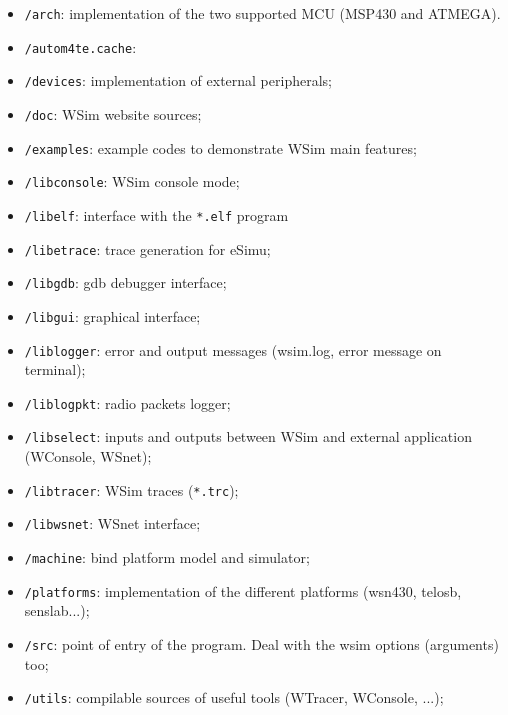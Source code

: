 \documentclass[a4paper,10pt]{report}
\begin{document}
\begin{itemize}
  \item \verb$/arch$: implementation of the two supported MCU (MSP430 and ATMEGA).

  \item \verb$/autom4te.cache$:

  \item \verb$/devices$: implementation of external peripherals;

  \item \verb$/doc$: WSim website sources;

  \item \verb$/examples$: example codes to demonstrate WSim main features;

  \item \verb$/libconsole$: WSim console mode;

  \item \verb$/libelf$: interface with the \verb$*.elf$ program

  \item \verb$/libetrace$: trace generation for eSimu;

  \item \verb$/libgdb$: gdb debugger interface;

  \item \verb$/libgui$: graphical interface;

  \item \verb$/liblogger$: error and output messages (wsim.log, error message on terminal);
  
  \item \verb$/liblogpkt$: radio packets logger;

  \item \verb$/libselect$: inputs and outputs between WSim and external application (WConsole, WSnet);

  \item \verb$/libtracer$: WSim traces (\verb$*.trc$);

  \item \verb$/libwsnet$: WSnet interface;

  \item \verb$/machine$: bind platform model and simulator;

  \item \verb$/platforms$: implementation of the different platforms (wsn430, telosb, senslab...);

  \item \verb$/src$: point of entry of the program. Deal with the wsim options (arguments) too;

  \item \verb$/utils$: compilable sources of useful tools (WTracer, WConsole, ...);
\end{itemize}
\end{document}
